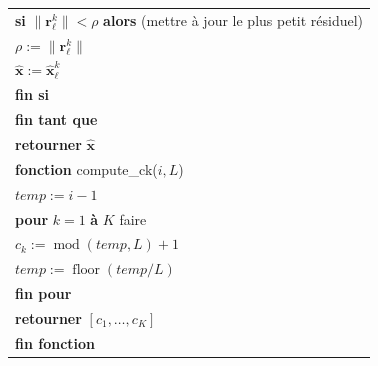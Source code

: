 \documentclass[9pt,a4paper,twoside]{rho}
\begin{document}
\begin{table}[H]
\begin{tabular}{>{\arraybackslash}p{9cm}}
        \quad \textbf{si} $\|\mathbf{r}_{\ell}^k\| < \rho$ \textbf{alors} \hfill (mettre à jour le plus petit résiduel) \\
        \quad \quad $\rho := \|\mathbf{r}_{\ell}^k\|$ \\
        \quad \quad $\hat{\mathbf{x}} := \hat{\mathbf{x}}_{\ell}^k$ \\
        \quad \textbf{fin si} \\
        \textbf{fin tant que} \\
        \textbf{retourner} $\hat{\mathbf{x}}$ \\
        \midrule
        \textbf{fonction} compute\_ck($i, L$) \\
        \quad $temp := i -1 $ \\
        \quad \textbf{pour} $k=1$ \textbf{à} $K$ faire \\
        \quad \quad $c_k := \operatorname{mod}(temp, L) + 1$ \\
        \quad \quad $temp := \operatorname{floor}(temp/L)$ \\
        \quad \textbf{fin pour} \\
        \quad \textbf{retourner} $[c_1, \ldots, c_K]$ \\
        \textbf{fin fonction} \\
        \bottomrule
    \end{tabular}
    \label{table:mmp-df}
\end{table}
\end{document}
